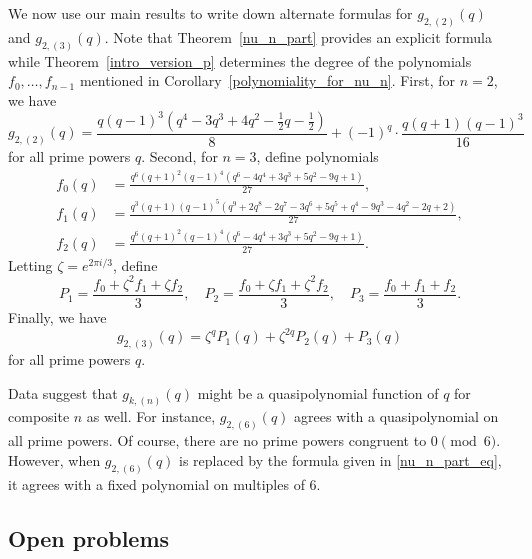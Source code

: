 \documentclass[Unicode,ALCO]{cedram}
\begin{document}
\begin{example}
We now use our main results to write down alternate formulas for \(g_{2,(2)} (q)\) and \(g_{2,(3)} (q)\).
Note that Theorem~\ref{nu_n_part} provides an explicit formula while Theorem~\ref{intro_version_p} determines the degree of the polynomials \(f_0,\ldots,f_{n-1}\) mentioned in Corollary~\ref{polynomiality_for_nu_n}.
First, for \(n = 2\), we have
\begin{equation}
g_{2,(2)}(q)
=
\frac{q (q - 1)^3 (q^4 - 3q^3 + 4q^2 - \tfrac{1}{2}q - \tfrac{1}{2})}{8}
+(-1)^q
\cdot
\frac{q(q + 1)(q - 1)^3}{16}
\end{equation}
for all prime powers \(q\).
Second, for \(n = 3\), define polynomials
\begin{align*}
f_0 (q) & = \frac{q^6 (q + 1)^2 (q - 1)^4  (q^6 - 4q^4 + 3q^3 + 5q^2 - 9q + 1)}{27}, \\
f_1 (q) & = \frac{q^3 (q + 1)  (q - 1)^5 (q^9 + 2q^8 - 2q^7 - 3q^6 + 5q^5 + q^4 - 9q^3 - 4q^2 - 2q + 2)}{27}, \\
f_2 (q) & = \frac{q^6 (q + 1)^2 (q - 1)^4  (q^6 - 4q^4 + 3q^3 + 5q^2 - 9q + 1)}{27}.
\end{align*}
Letting \(\zeta = e^{2 \pi i / 3}\), define
\begin{equation*}
P_1 = \frac{f_0 + \zeta^2 f_1 + \zeta f_2}{3},
\quad
P_2 = \frac{f_0 + \zeta f_1 + \zeta^2 f_2}{3},
\quad
P_3 = \frac{f_0 + f_1 + f_2}{3}.
\end{equation*}
Finally, we have
\begin{equation}
g_{2,(3)} (q) = \zeta^q P_1(q) + \zeta^{2q} P_2(q) + P_3(q)
\end{equation}
for all prime powers \(q\).
\end{example}





\begin{remark}
\label{bummer}
Data suggest that \(g_{k,(n)}(q)\) might be a quasipolynomial function of \(q\) for composite \(n\) as well.
For instance, \(g_{2,(6)}(q)\) agrees with a quasipolynomial on all prime powers.
Of course, there are no prime powers congruent to \(0 \pmod{6}\).
However, when \(g_{2,(6)}(q)\) is replaced by the formula given in \eqref{nu_n_part_eq}, it agrees with a fixed polynomial on multiples of \(6\).
\end{remark}






\subsection{Open problems}
\end{document}
